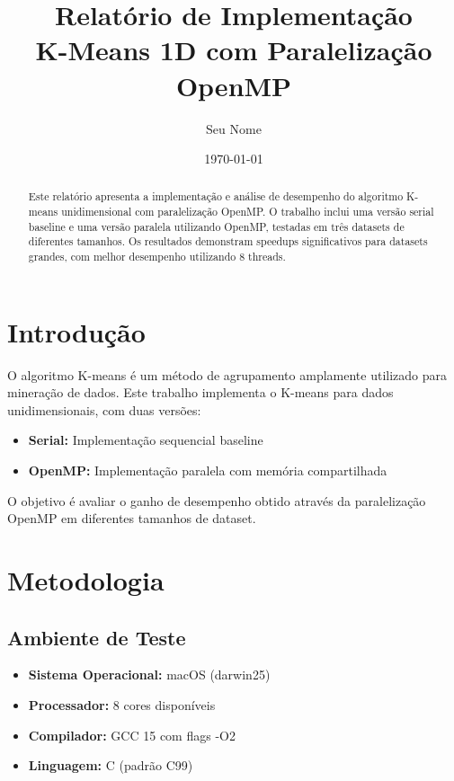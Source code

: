 \documentclass[12pt,a4paper]{article}
\title{\textbf{Relatório de Implementação} \\ 
K-Means 1D com Paralelização OpenMP}
\author{Seu Nome}
\date{\today}
\begin{document}
\maketitle

\begin{abstract}
Este relatório apresenta a implementação e análise de desempenho do algoritmo K-means unidimensional com paralelização OpenMP. O trabalho inclui uma versão serial baseline e uma versão paralela utilizando OpenMP, testadas em três datasets de diferentes tamanhos. Os resultados demonstram speedups significativos para datasets grandes, com melhor desempenho utilizando 8 threads.
\end{abstract}

\section{Introdução}

O algoritmo K-means é um método de agrupamento amplamente utilizado para mineração de dados. Este trabalho implementa o K-means para dados unidimensionais, com duas versões:

\begin{itemize}
    \item \textbf{Serial:} Implementação sequencial baseline
    \item \textbf{OpenMP:} Implementação paralela com memória compartilhada
\end{itemize}

O objetivo é avaliar o ganho de desempenho obtido através da paralelização OpenMP em diferentes tamanhos de dataset.

\section{Metodologia}

\subsection{Ambiente de Teste}

\begin{itemize}
    \item \textbf{Sistema Operacional:} macOS (darwin25)
    \item \textbf{Processador:} 8 cores disponíveis
    \item \textbf{Compilador:} GCC 15 com flags -O2
    \item \textbf{Linguagem:} C (padrão C99)
\end{itemize}
\end{document}
